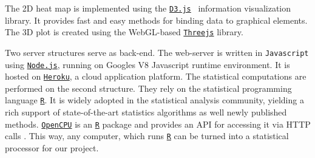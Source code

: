 \documentclass[journal]{style/vgtc} 			          %
\begin{document}
The 2D heat map is implemented using the \href{http://d3js.org/}{\texttt{D3.js}}~\cite{D3} information visualization library.
It provides fast and easy methods for binding data to graphical elements.
The 3D plot is created using the WebGL-based \href{http://threejs.org}{\texttt{Threejs}} library.

Two server structures serve as back-end.
The web-server is written in \texttt{Javascript} using \href{http://nodejs.org}{\texttt{Node.js}}, running on Googles V8 Javascript runtime environment.
It is hosted on \href{https://www.heroku.com/}{\texttt{Heroku}}, a cloud application platform.
The statistical computations are performed on the second structure.
They rely on the statistical programming language \href{http://r-project.org}{\texttt{R}}.
It is widely adopted in the statistical analysis community, yielding a rich support of state-of-the-art statistics algorithms as well newly published methods.
\href{https://www.opencpu.org/}{\texttt{OpenCPU}} is an \href{http://r-project.org}{\texttt{R}} package and provides an API for accessing it via HTTP calls \cite{Ooms}.
This way, any computer, which runs \href{http://r-project.org}{\texttt{R}} can be turned into a statistical processor for our project.
\end{document}
